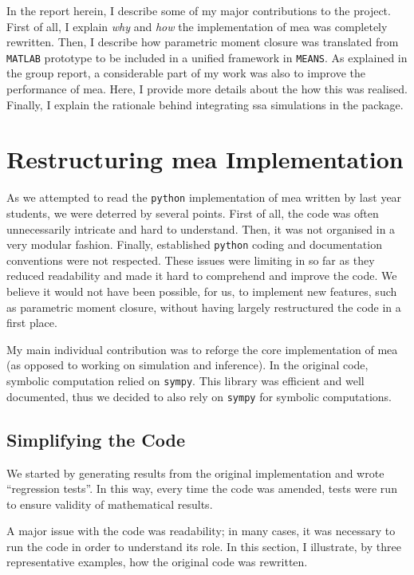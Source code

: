 \documentclass[11pt,a4paper]{article}
\newcommand{\means}{\texttt{MEANS}}
\newcommand{\py}{\texttt{python}}
\newcommand{\sympy}{\texttt{sympy}}
\newcommand{\mat}{\texttt{MATLAB}}
\begin{document}
In the report herein, I describe some of my major contributions to the project.
First of all, I explain \emph{why} and \emph{how} the implementation of \acrlong{mea} was completely rewritten.
Then, I describe how parametric moment closure was translated from \mat{} prototype to be included in a unified framework in \means.
As explained in the group report, a considerable part of my work was also to improve the performance of \gls{mea}.
Here, I provide more details about the how this was realised.  
Finally, I explain the rationale behind integrating \acrlong{ssa} simulations in the package.

\section{Restructuring \acrlong{mea} Implementation}
As we attempted to read the \py{} implementation of \acrshort{mea} written by last year students\cite{babtie_moment_2013},
we were deterred by several points.
First of all, the code was often unnecessarily intricate and hard to understand.
Then, it was not organised in a very modular fashion.
Finally, established \py{} coding and documentation conventions\cite{_pep_????} were not respected.
These issues were limiting in so far as they reduced readability and made it hard to comprehend and improve the code.
We believe it would not have been possible, for us, to implement new features, such as parametric moment closure,
without having largely restructured the code in a first place.

My main individual contribution was to reforge the core implementation of \acrshort{mea} (as opposed to working on simulation and inference).
In the original code, symbolic computation relied on \sympy{}\cite{sympy_development_team_sympy:_2014}.
This library was efficient and well documented, thus we decided to also rely on \sympy{} for symbolic computations.
 
\subsection{Simplifying the Code}
We started by generating results from the original implementation and wrote ``regression tests''.
In this way, every time the code was amended, tests were run to ensure validity of mathematical results.

A major issue with the code was readability; in many cases, it was necessary to run the code in order to understand its role.
In this section, I illustrate, by three representative examples, how the original code was rewritten.
\end{document}
